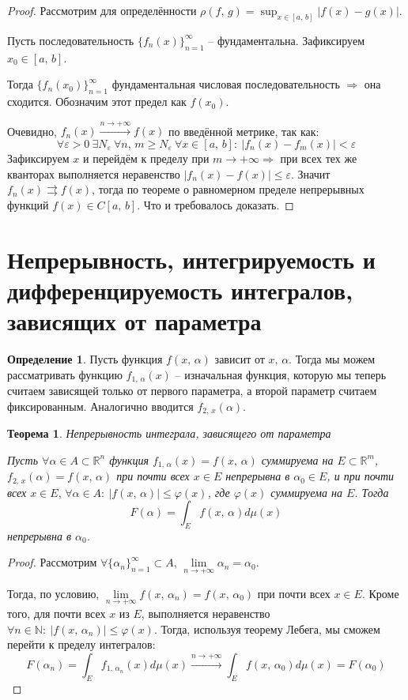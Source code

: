 \documentclass[a4paper,12pt]{article}
\renewcommand{\phi}{\ensuremath{\varphi}}
\renewcommand{\leq}{\ensuremath{\leqslant}}
\renewcommand{\geq}{\ensuremath{\geqslant}}
\theoremstyle{plain}
\newtheorem{theorem}{Теорема}[section]
\theoremstyle{definition}
\newtheorem{definition}{Определение}[section]
\theoremstyle{remark}
\begin{document}
\begin{proof}
	Рассмотрим для определённости $\rho(f,\,g) = \sup_{x \in [a,\,b]}|f(x) - g(x)|$.

	Пусть последовательность $\{f_n(x)\}_{n = 1}^\infty$ -- фундаментальна. Зафиксируем $x_0 \in [a,\,b]$. 
	
	Тогда $\{f_n(x_0)\}_{n = 1}^\infty$ фундаментальная числовая последовательность $\Rightarrow$ она сходится. Обозначим этот предел как $f(x_0)$.
	
	Очевидно, $f_n(x) \stackrel{n \to +\infty}{\to} f(x)$ по введённой метрике, так как:
	\[\forall \varepsilon > 0 \: \exists N_\varepsilon \: \forall n,\,m \geq N_\varepsilon \: \forall x \in [a,\,b] :\: |f_n(x) - f_m(x)| < \varepsilon\]
	Зафиксируем $x$ и перейдём к пределу при $m \to +\infty \Rightarrow$ при всех тех же кванторах выполняется неравенство $|f_n(x) - f(x)| \leq \varepsilon$. Значит $f_n(x) \rightrightarrows f(x)$, тогда по теореме о равномерном пределе непрерывных функций $f(x) \in C[a,\,b]$. Что и требовалось доказать.
\end{proof}

\section{Непрерывность, интегрируемость и дифференцируемость интегралов, зависящих от параметра}
\begin{definition}
	Пусть функция $f(x,\,\alpha)$ зависит от $x,\, \alpha$. Тогда мы можем рассматривать функцию $f_{1,\,\alpha}(x)$ -- изначальная функция, которую мы теперь считаем зависящей только от первого параметра, а второй параметр считаем фиксированным. Аналогично вводится $f_{2,\,x}(\alpha)$.
\end{definition}

\begin{theorem}
	Непрерывность интеграла, зависящего от параметра

	Пусть $\forall \alpha \in A \subset \mathbb{R}^n$ функция $f_{1,\,\alpha}(x) = f(x,\,\alpha)$ суммируема на $E \subset \mathbb{R}^m$, $f_{2,\,x}(\alpha) = f(x,\,\alpha)$ при почти всех $x \in E$ непрерывна в $\alpha_0 \in E$, и при почти всех $x \in E,\, \forall \alpha \in A :\: |f(x,\,\alpha)| \leq \phi(x)$, где $\phi(x)$ суммируема на $E$. Тогда
	\[F(\alpha) = \int_E f(x,\, \alpha)d\mu(x)\]
	непрерывна в $\alpha_0$.
\end{theorem}

\begin{proof}
	Рассмотрим $\forall \{\alpha_n\}_{n = 1}^\infty \subset A,\, \lim\limits_{n\to +\infty}\alpha_n = \alpha_0$.

	Тогда, по условию, $\lim\limits_{n \to +\infty} f(x,\,\alpha_n) = f(x,\,\alpha_0)$ при почти всех $x \in E$. Кроме того, для почти всех $x$ из $E$, выполняется неравенство $\forall n \in \mathbb{N}:\: |f(x,\,\alpha_n)| \leq \phi(x)$. Тогда, используя теорему Лебега, мы сможем перейти к пределу интегралов:
	\[F(\alpha_n) = \int_E f_{1,\, \alpha_n}(x)d\mu(x) \stackrel{n \to +\infty}{\to} \int_E f(x,\,\alpha_0)d\mu(x) = F(\alpha_0)\]
\end{proof}
\end{document}
